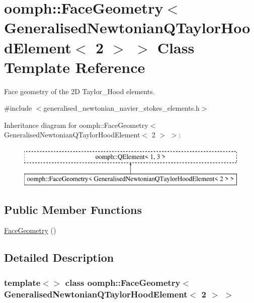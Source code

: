 \hypertarget{classoomph_1_1FaceGeometry_3_01GeneralisedNewtonianQTaylorHoodElement_3_012_01_4_01_4}{}\section{oomph\+:\+:Face\+Geometry$<$ Generalised\+Newtonian\+Q\+Taylor\+Hood\+Element$<$ 2 $>$ $>$ Class Template Reference}
\label{classoomph_1_1FaceGeometry_3_01GeneralisedNewtonianQTaylorHoodElement_3_012_01_4_01_4}


Face geometry of the 2D Taylor\+\_\+\+Hood elements.  




{\ttfamily \#include $<$generalised\+\_\+newtonian\+\_\+navier\+\_\+stokes\+\_\+elements.\+h$>$}

Inheritance diagram for oomph\+:\+:Face\+Geometry$<$ Generalised\+Newtonian\+Q\+Taylor\+Hood\+Element$<$ 2 $>$ $>$\+:\begin{figure}[H]
\begin{center}
\leavevmode
\includegraphics[height=2.000000cm]{classoomph_1_1FaceGeometry_3_01GeneralisedNewtonianQTaylorHoodElement_3_012_01_4_01_4}
\end{center}
\end{figure}
\subsection*{Public Member Functions}
\begin{DoxyCompactItemize}
\item 
\hyperlink{classoomph_1_1FaceGeometry_3_01GeneralisedNewtonianQTaylorHoodElement_3_012_01_4_01_4_a14890ff88480ec042be90f44f8abbf50}{Face\+Geometry} ()
\end{DoxyCompactItemize}


\subsection{Detailed Description}
\subsubsection*{template$<$$>$\newline
class oomph\+::\+Face\+Geometry$<$ Generalised\+Newtonian\+Q\+Taylor\+Hood\+Element$<$ 2 $>$ $>$}

